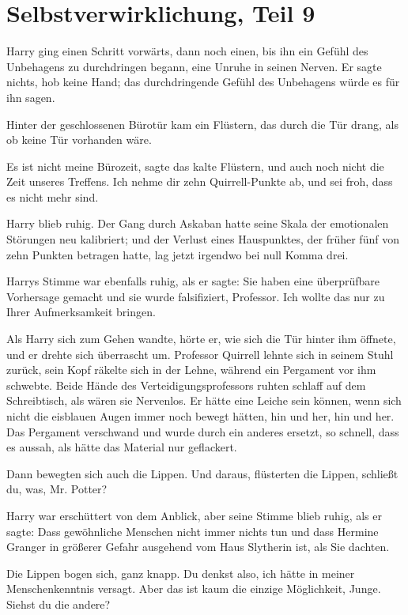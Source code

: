 \chapter{Selbstverwirklichung, Teil 9}

Harry ging einen Schritt vorwärts, dann noch einen, bis ihn ein Gefühl des
Unbehagens zu durchdringen begann, eine Unruhe in seinen Nerven. Er sagte
nichts, hob keine Hand; das durchdringende Gefühl des Unbehagens würde es für
ihn sagen.

Hinter der geschlossenen Bürotür kam ein Flüstern, das durch die Tür drang, als
ob keine Tür vorhanden wäre.

\glqq{}Es ist nicht meine Bürozeit\grqq{}, sagte das kalte Flüstern, \glqq{}und
auch noch nicht die Zeit unseres Treffens. Ich nehme dir zehn Quirrell-Punkte
ab, und sei froh, dass es nicht mehr sind.\grqq{}

Harry blieb ruhig. Der Gang durch Askaban hatte seine Skala der emotionalen
Störungen neu kalibriert; und der Verlust eines Hauspunktes, der früher fünf von
zehn Punkten betragen hatte, lag jetzt irgendwo bei null Komma drei.

Harrys Stimme war ebenfalls ruhig, als er sagte: \glqq{}Sie haben eine
überprüfbare Vorhersage gemacht und sie wurde falsifiziert, Professor. Ich
wollte das nur zu Ihrer Aufmerksamkeit bringen.\grqq{}

Als Harry sich zum Gehen wandte, hörte er, wie sich die Tür hinter ihm öffnete,
und er drehte sich überrascht um. Professor Quirrell lehnte sich in seinem Stuhl
zurück, sein Kopf räkelte sich in der Lehne, während ein Pergament vor ihm
schwebte. Beide Hände des Verteidigungsprofessors ruhten schlaff auf dem
Schreibtisch, als wären sie Nervenlos. Er hätte eine Leiche sein können, wenn
sich nicht die eisblauen Augen immer noch bewegt hätten, hin und her, hin und
her. Das Pergament verschwand und wurde durch ein anderes ersetzt, so schnell,
dass es aussah, als hätte das Material nur geflackert.

Dann bewegten sich auch die Lippen. \glqq{}Und daraus\grqq{}, flüsterten die
Lippen, \glqq{}schließt du, was, Mr. Potter?\grqq{}

Harry war erschüttert von dem Anblick, aber seine Stimme blieb ruhig, als er
sagte: \glqq{}Dass gewöhnliche Menschen nicht immer nichts tun und dass Hermine
Granger in größerer Gefahr ausgehend vom Haus Slytherin ist, als Sie
dachten.\grqq{}

Die Lippen bogen sich, ganz knapp. \glqq{}Du denkst also, ich hätte in meiner
Menschenkenntnis versagt. Aber das ist kaum die einzige Möglichkeit, Junge.
Siehst du die andere?\grqq{}

